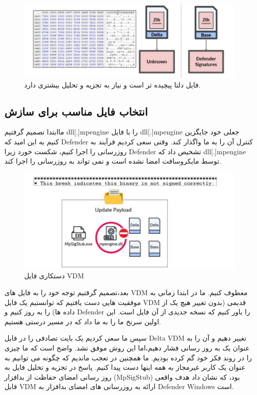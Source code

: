 \documentclass{ISCISC2020}
\begin{document}
\begin{figure}[h]
	\includegraphics[width=\linewidth]{Images/4.png}
	\caption{فایل دلتا پیچیده تر است و نیاز به تجزیه و تحلیل بیشتری دارد.}
\end{figure}

\subsection{انتخاب فایل مناسب برای سازش}
ماابتدا تصمیم گرفتیم dll[.]mpengine را با فایل dll[.]mpengine جعلی خود جایگزین کنیم به این امید که 
Defender کنترل آن را به ما واگذار کند. وقتی سعی کردیم فرآیند به روزرسانی را اجرا کنیم، شکست خورد زیرا 
Defender تشخیص داد که dll[.]mpengine توسط مایکروسافت امضا نشده است و نمی تواند به روزرسانی را اجرا 
کند.

\begin{figure}[h]
	\includegraphics[width=\linewidth]{Images/3.png}
	\caption{دستکاری فایل VDM}
\end{figure}

بعد،تصمیم گرفتیم توجه خود را به فایل های VDM معطوف کنیم. ما در ابتدا زمانی به موفقیت هایی دست یافتیم که 
توانستیم یک فایل VDM قدیمی (بدون تغییر هیچ یک از داده ها) را به روز کنیم و Defender را باور کنیم که نسخه 
جدیدی از آن فایل است. این اولین سرنخ ما را به ما داد که در مسیر درستی هستیم.


سپس ما سعی کردیم یک بایت تصادفی را در فایل Delta VDM تغییر دهیم و آن را به عنوان یک به روز رسانی فشار 
دهیم،اما این روش موفق نشد. واضح است که ما چیزی را در روند فکر خود گم کرده بودیم. ما همچنین در تعجب 
ماندیم که چگونه می توانیم به عنوان یک کاربر غیرمجاز به همه اینها دست پیدا کنیم. پاسخ در تجزیه و تحلیل فایل به روز 
رسانی امضای حفاظت از بدافزار (MpSigStub) بود، که نشان داد هدف واقعی فایل VDM ارائه به روزرسانی های 
امضای بدافزار به Defender Windows است.
\end{document}
